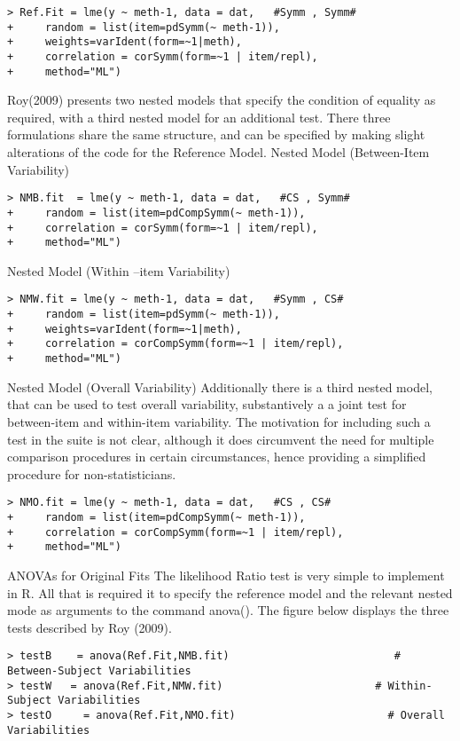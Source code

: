 \begin{verbatim}
> Ref.Fit = lme(y ~ meth-1, data = dat,   #Symm , Symm#
+     random = list(item=pdSymm(~ meth-1)), 
+     weights=varIdent(form=~1|meth),
+     correlation = corSymm(form=~1 | item/repl), 
+     method="ML")
\end{verbatim}
Roy(2009) presents two nested models that specify the condition of equality as required, with a third nested model for an additional test. There three formulations share the same structure, and can be specified by making slight alterations of the code for the Reference Model.
Nested Model (Between-Item Variability)

\begin{verbatim}
> NMB.fit  = lme(y ~ meth-1, data = dat,   #CS , Symm#
+     random = list(item=pdCompSymm(~ meth-1)),
+     correlation = corSymm(form=~1 | item/repl), 
+     method="ML")
\end{verbatim}




Nested Model (Within –item Variability)
\begin{verbatim}
> NMW.fit = lme(y ~ meth-1, data = dat,   #Symm , CS# 
+     random = list(item=pdSymm(~ meth-1)),
+     weights=varIdent(form=~1|meth), 
+     correlation = corCompSymm(form=~1 | item/repl), 
+     method="ML")
\end{verbatim}

Nested Model (Overall Variability)
Additionally there is a third nested model, that can be used to test overall variability, substantively a a joint test for between-item and within-item variability. The motivation for including such a test in the suite is not clear, although it does circumvent the need for multiple comparison procedures in certain circumstances, hence providing a simplified procedure for non-statisticians.
\begin{verbatim}
> NMO.fit = lme(y ~ meth-1, data = dat,   #CS , CS# 
+     random = list(item=pdCompSymm(~ meth-1)), 
+     correlation = corCompSymm(form=~1 | item/repl), 
+     method="ML")
\end{verbatim}

ANOVAs  for  Original Fits
The likelihood Ratio test is very simple to implement in R. All that is required it to specify the reference model and the relevant nested mode as arguments to the command anova().
The figure below displays the three tests described by Roy (2009).

\begin{verbatim}
> testB    = anova(Ref.Fit,NMB.fit)                          # Between-Subject Variabilities
> testW   = anova(Ref.Fit,NMW.fit)                        # Within-Subject Variabilities
> testO     = anova(Ref.Fit,NMO.fit)                        # Overall Variabilities
\end{verbatim}

